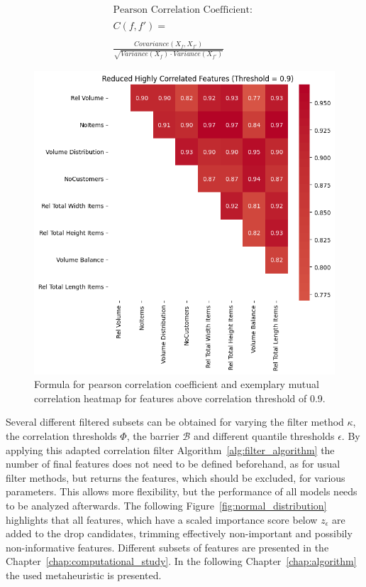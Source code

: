 \begin{figure}[ht]
    \centering
    \begin{minipage}{.48\linewidth}
        \begin{gather*}
            \text{Pearson Correlation Coefficient: } \\\\C(f,f') = \\\\\frac{Covariance(X_f,X_{f'})}{\sqrt{Variance(X_f)\cdot Variance(X_{f'})}}
        \end{gather*}
    \end{minipage}%
    \begin{minipage}{.48\linewidth}
        \includegraphics[width=\linewidth]{pictures/exemplary_small_correlation_matrix.png}
    \end{minipage}
    \caption{Formula for pearson correlation coefficient and exemplary mutual correlation heatmap for features above correlation threshold of 0.9. }
    \label{fig:pearson_correlation_example}
\end{figure}

Several different filtered subsets can be obtained for varying the filter method $\kappa$, the correlation thresholds $\Phi$, the barrier $\mathcal{B}$ and
different quantile thresholds $\epsilon$. By applying this adapted correlation filter Algorithm~\ref{alg:filter_algorithm} the number of final
features does not need to be defined beforehand, as for usual filter methods, but returns the features, which should be excluded, for
various parameters. This allows more flexibility, but the performance of all models needs to be analyzed afterwards.
The following Figure~\ref{fig:normal_distribution} highlights that all features, which have a scaled importance score below $z_{\epsilon}$ are added to the drop candidates, trimming
effectively non-important and possibily non-informative features. Different subsets of features are presented in the Chapter~\ref{chap:computational_study}.
In the following Chapter~\ref{chap:algorithm} the used metaheuristic is presented.

